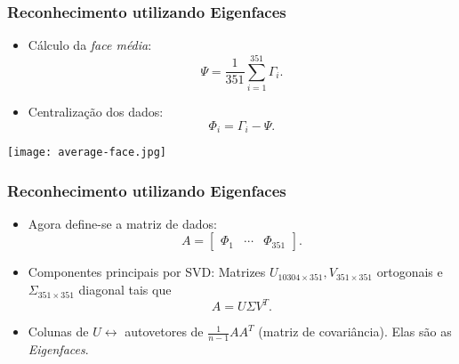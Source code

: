 \documentclass[15pt]{beamer}
\begin{document}
\begin{frame}
    \frametitle{Reconhecimento utilizando Eigenfaces}

    \begin{itemize}
        \item<1-> Cálculo da \emph{face média}: \[
                \Psi = \frac{ 1 }{ 351 } \sum_{ i=1 }^{ 351 } \Gamma_{ i }
            .\]

        \item<2-> Centralização dos dados: \[
                \Phi_{ i } = \Gamma_{ i } - \Psi
            .\]

    \end{itemize}

    \pause

    \begin{center}
        \texttt{[image: average-face.jpg]}
    \end{center}

\end{frame}

\begin{frame}
    \frametitle{Reconhecimento utilizando Eigenfaces}

    \begin{itemize}
        \item<1-> Agora define-se a matriz de dados: \[
                A =
                \begin{bmatrix}
                    \Phi_{ 1 } & \cdots & \Phi_{ 351 }
                \end{bmatrix}
            .\]

        \item<2-> Componentes principais por SVD:
            Matrizes \( U_{ 10304 \times 351 }, V_{ 351 \times 351 } \) ortogonais e \( \Sigma_{ 351 \times 351 } \) diagonal tais que \[
                A = U \Sigma V^{ T }
            .\]

        \item<3-> Colunas de \( U \leftrightarrow \) autovetores de \( \frac{ 1 }{ n-1 } AA^{ T } \) (matriz de covariância).
            Elas são as \emph{Eigenfaces}.

    \end{itemize}
\end{frame}
\end{document}
